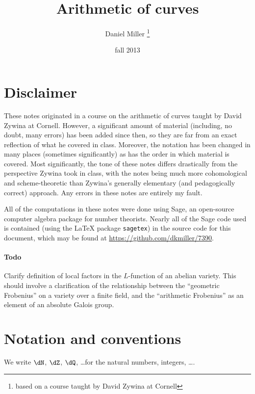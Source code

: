 \documentclass{article}
\title{Arithmetic of curves}
\author{Daniel Miller
  \thanks{based on a course taught by David Zywina at Cornell}}
\date{fall 2013}
\begin{document}
\maketitle
\tableofcontents





\newpage
\section*{Disclaimer}

These notes originated in a course on the arithmetic of curves taught by David 
Zywina at Cornell. However, a significant amount of material (including, no 
doubt, many errors) has been added since then, so they are far from an exact 
reflection of what he covered in class. Moreover, the notation has been changed 
in many places (sometimes significantly) as has the order in which material is 
covered. Most significantly, the tone of these notes differs drastically 
from the perspective Zywina took in class, with the notes being much more 
cohomological and scheme-theoretic than Zywina's generally elementary (and 
pedagogically correct) approach. Any errors in these notes are entirely my 
fault. 

All of the computations in these notes were done using Sage, an open-source 
computer algebra package for number theorists. Nearly all of the Sage code 
used is contained (using the \LaTeX{} package \texttt{sagetex}) in the source 
code for this document, which may be found at 
\url{https://github.com/dkmiller/7390}. 


\paragraph{Todo}
Clarify definition of local factors in the $L$-function of an abelian variety. 
This should involve a clarification of the relationship between the ``geometric 
Frobenius'' on a variety over a finite field, and the ``arithmetic Frobenius'' 
as an element of an absolute Galois group. 





\section*{Notation and conventions}

We write $\dN$, $\dZ$, $\dQ$, \ldots for the natural numbers, integers, \ldots. 
\end{document}
